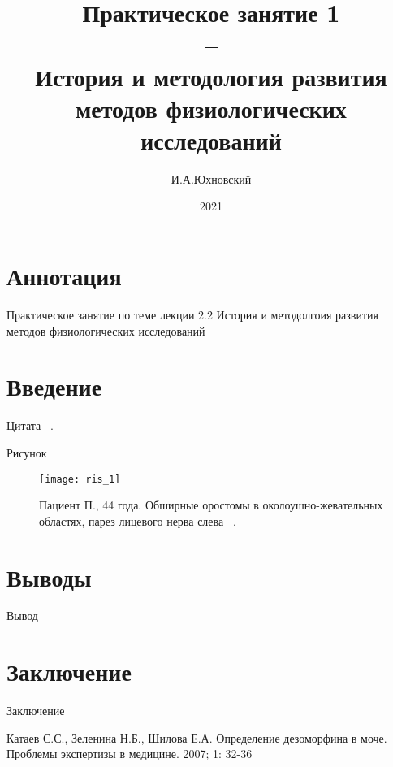\documentclass[11pt]{article}
\title{\textbf{Практическое занятие 1  \\ -- \\ 
		История и методология развития методов физиологических исследований}}
\author{И.А.Юхновский}
\date{2021}
\begin{document}
	
	\maketitle
	\thispagestyle{empty}
	\section*{Аннотация}
	Практическое занятие по теме лекции 2.2 История и методолгоия развития методов физиологических исследований
	
	\tableofcontents{}
	
	\section{Введение}
 	Цитата  ~\cite{kataev}.
	
	Рисунок
	\begin{figure}[H]
		\centering
		\texttt{[image: ris\_1]}
		\caption{Пациент  П., 44 года. Обширные оростомы в околоушно-жевательных областях, парез лицевого нерва слева ~\cite{rsj}.}
		\label{fig:ris_1}
	\end{figure}
	
	\section{Выводы}
	Вывод
	
	\section{Заключение}
	Заключение
	
	\begin{thebibliography}{3}
		 Катаев С.С., Зеленина Н.Б., Шилова Е.А. Определение	дезоморфина в моче. Проблемы экспертизы в медицине.	2007; 1: 32-36 
		
	\end{thebibliography}
	
\end{document}
